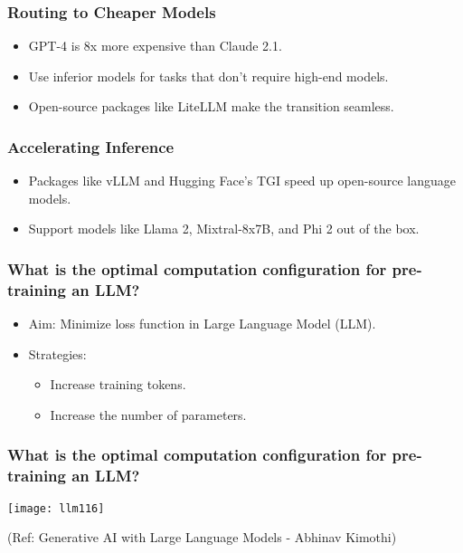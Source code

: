 \begin{frame}[fragile]\frametitle{Routing to Cheaper Models}
    \begin{itemize}
        \item GPT-4 is 8x more expensive than Claude 2.1.
        \item Use inferior models for tasks that don't require high-end models.
        \item Open-source packages like LiteLLM make the transition seamless.
    \end{itemize}
\end{frame}

\begin{frame}[fragile]\frametitle{Accelerating Inference}
    \begin{itemize}
        \item Packages like vLLM and Hugging Face's TGI speed up open-source language models.
        \item Support models like Llama 2, Mixtral-8x7B, and Phi 2 out of the box.
    \end{itemize}
\end{frame}

\begin{frame}[fragile]\frametitle{What is the optimal computation configuration for pre-training an LLM?}

  \begin{itemize}
    \item Aim: Minimize loss function in Large Language Model (LLM).
    \item Strategies:
    \begin{itemize}
      \item Increase training tokens.
      \item Increase the number of parameters.
    \end{itemize}
  \end{itemize}

\end{frame}

\begin{frame}[fragile]\frametitle{What is the optimal computation configuration for pre-training an LLM?}

	
	\begin{center}
	\texttt{[image: llm116]}
	\end{center}

	{\tiny (Ref: Generative AI with Large Language Models - Abhinav  Kimothi)}

\end{frame}

